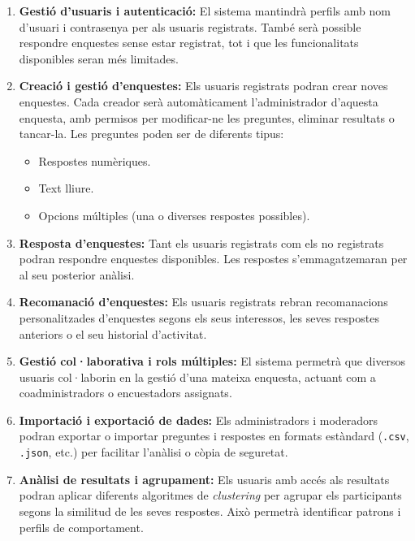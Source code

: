\documentclass[../main.tex]{subfiles}
\begin{document}
\begin{enumerate}
    \item \textbf{Gestió d’usuaris i autenticació:}  
    El sistema mantindrà perfils amb nom d’usuari i contrasenya per als usuaris registrats.  
    També serà possible respondre enquestes sense estar registrat, 
    tot i que les funcionalitats disponibles seran més limitades.

    \item \textbf{Creació i gestió d’enquestes:}  
    Els usuaris registrats podran crear noves enquestes.  
    Cada creador serà automàticament l’administrador d’aquesta enquesta, 
    amb permisos per modificar-ne les preguntes, eliminar resultats o tancar-la.  
    Les preguntes poden ser de diferents tipus:
    \begin{itemize}
        \item Respostes numèriques.
        \item Text lliure.
        \item Opcions múltiples (una o diverses respostes possibles).
    \end{itemize}

    \item \textbf{Resposta d’enquestes:}  
    Tant els usuaris registrats com els no registrats podran respondre enquestes disponibles.  
    Les respostes s’emmagatzemaran per al seu posterior anàlisi.

    \item \textbf{Recomanació d’enquestes:}  
    Els usuaris registrats rebran recomanacions personalitzades d’enquestes 
    segons els seus interessos, les seves respostes anteriors o el seu historial d’activitat.

    \item \textbf{Gestió col·laborativa i rols múltiples:}  
    El sistema permetrà que diversos usuaris col·laborin en la gestió d’una mateixa enquesta, 
    actuant com a coadministradors o encuestadors assignats.

    \item \textbf{Importació i exportació de dades:}  
    Els administradors i moderadors podran exportar o importar preguntes i respostes 
    en formats estàndard (\texttt{.csv}, \texttt{.json}, etc.) per facilitar l’anàlisi o còpia de seguretat.

    \item \textbf{Anàlisi de resultats i agrupament:}  
    Els usuaris amb accés als resultats podran aplicar diferents algoritmes de \textit{clustering} 
    per agrupar els participants segons la similitud de les seves respostes.  
    Això permetrà identificar patrons i perfils de comportament.


\end{enumerate}
\end{document}
